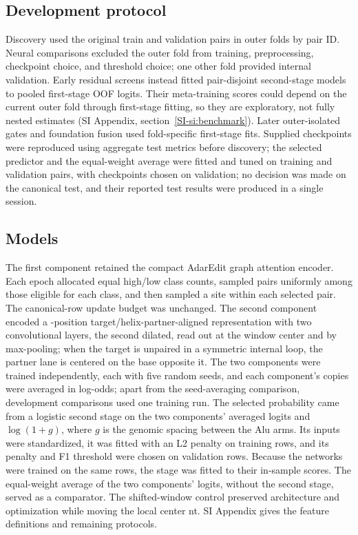 \documentclass[9pt,twocolumn,twoside]{pnas-new}
\newcommand{\SIref}[1]{\ref*{SI-#1}}
\begin{document}
{\subsection*{Development protocol}
Discovery used the original train and validation pairs in \NOuterFolds{} outer folds by pair ID. Neural comparisons excluded the outer fold from training, preprocessing, checkpoint choice, and threshold choice; one other fold provided internal validation. Early residual screens instead fitted pair-disjoint second-stage models to pooled first-stage OOF logits. Their meta-training scores could depend on the current outer fold through first-stage fitting, so they are exploratory, not fully nested estimates (SI Appendix, section~\SIref{si:benchmark}). Later outer-isolated gates and foundation fusion used fold-specific first-stage fits. Supplied checkpoints were reproduced using aggregate test metrics before discovery; the selected predictor and the equal-weight average were fitted and tuned on training and validation pairs, with checkpoints chosen on validation; no decision was made on the canonical test, and their reported test results were produced in a single session.

\subsection*{Models}
The first component retained the compact AdarEdit graph attention encoder. Each epoch allocated equal high/low class counts, sampled pairs uniformly among those eligible for each class, and then sampled a site within each selected pair. The canonical-row update budget was unchanged. The second component encoded a \LocalWindowWidth{}-position target/helix-partner-aligned representation with two convolutional layers, the second dilated, read out at the window center and by max-pooling; when the target is unpaired in a symmetric internal loop, the partner lane is centered on the base opposite it. The two components were trained independently, each with five random seeds, and each component's copies were averaged in log-odds; apart from the seed-averaging comparison, development comparisons used one training run. The selected probability came from a logistic second stage on the two components' averaged logits and $\log(1+g)$, where $g$ is the genomic spacing between the Alu arms. Its inputs were standardized, it was fitted with an L2 penalty on training rows, and its penalty and F1 threshold were chosen on validation rows. Because the networks were trained on the same rows, the stage was fitted to their in-sample scores. The equal-weight average of the two components' logits, without the second stage, served as a comparator. The shifted-window control preserved architecture and optimization while moving the local center \LocalControlShift{} nt. SI Appendix gives the feature definitions and remaining protocols.

}
\end{document}
